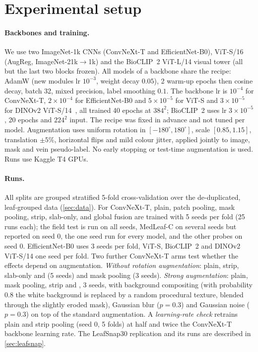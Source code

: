 \section{Experimental setup}
\label{sec:experiments}

\paragraph{Backbones and training.} We use two ImageNet-1k CNNs (ConvNeXt-T and
EfficientNet-B0), ViT-S/16 (AugReg, ImageNet-21k$\to$1k) and the BioCLIP~2 ViT-L/14 visual tower (all
but the last two blocks frozen). All models of a backbone share the recipe: AdamW (new modules lr
$10^{-3}$, weight decay $0.05$), 2 warm-up epochs then cosine decay, batch 32, mixed precision, label
smoothing $0.1$. The backbone lr is $10^{-4}$ for ConvNeXt-T, $2\times10^{-4}$ for EfficientNet-B0 and
$5\times10^{-5}$ for ViT-S and $3\times10^{-5}$ for DINOv2 ViT-S/14~\citep{oquab2024dinov2}, all trained 40 epochs at $384^2$; BioCLIP~2 uses lr $3\times10^{-5}$,
20 epochs and $224^2$ input. The recipe was fixed in advance and not tuned per model. Augmentation
uses uniform rotation in $[-180^\circ,180^\circ]$, scale $[0.85,1.15]$, translation $\pm5\%$,
horizontal flips and mild colour jitter, applied jointly to image, mask and vein pseudo-label. No
early stopping or test-time augmentation is used. Runs use Kaggle T4 GPUs.

\paragraph{Runs.} All splits are grouped stratified 5-fold cross-validation over the de-duplicated,
leaf-grouped data (\cref{sec:data}). For ConvNeXt-T, plain, patch pooling, mask pooling, strip, slab-only, \SVA{}
and global fusion are trained with 5 seeds per fold (25 runs each); the field test is run on all seeds, MedLeaf-C on several seeds but
reported on seed 0, the one seed run for every model, and the other probes on seed 0. EfficientNet-B0 uses 3 seeds per fold, ViT-S,
BioCLIP~2 and DINOv2 ViT-S/14 one seed per fold. Two further ConvNeXt-T arms test whether the effects
depend on augmentation. \emph{Without rotation augmentation}: plain, strip, slab-only and \SVA{}
(5 seeds) and mask pooling (3 seeds). \emph{Strong augmentation}: plain, mask pooling, strip and
\SVA{}, 3 seeds, with background compositing (with probability 0.8 the white background is replaced
by a random procedural texture, blended through the slightly eroded mask), Gaussian blur ($p=0.3$)
and Gaussian noise ($p=0.3$) on top of the standard augmentation. A \emph{learning-rate check} retrains
plain and strip pooling (seed 0, 5 folds) at half and twice the ConvNeXt-T backbone learning rate. The
LeafSnap30 replication and its runs are described in \cref{sec:leafsnap}.

